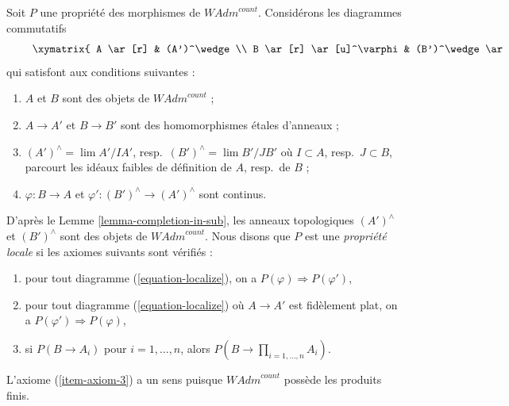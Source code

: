 \begin{situation}
\label{situation-local-property}
Soit $P$ une propriété des morphismes de $\textit{WAdm}^{count}$.
Considérons les diagrammes commutatifs
\begin{equation}
\label{equation-localize}
\vcenter{
\xymatrix{
A \ar[r] & (A')^\wedge \\
B \ar[r] \ar[u]^\varphi & (B')^\wedge \ar[u]_{\varphi'}
}
}
\end{equation}
qui satisfont aux conditions suivantes :
\begin{enumerate}
\item $A$ et $B$ sont des objets de $\textit{WAdm}^{count}$ ;
\item $A \to A'$ et $B \to B'$ sont des homomorphismes étales d'anneaux ;
\item $(A')^\wedge = \lim A'/IA'$, resp.\  $(B')^\wedge = \lim B'/JB'$
où $I \subset A$, resp.\ $J \subset B$,
parcourt les idéaux faibles de définition de $A$, resp.\ de $B$ ;
\item $\varphi : B \to A$ et $\varphi' : (B')^\wedge \to (A')^\wedge$
sont continus.
\end{enumerate}
D'après le Lemme \ref{lemma-completion-in-sub}, les anneaux topologiques
$(A')^\wedge$ et $(B')^\wedge$ sont des objets de $\textit{WAdm}^{count}$.
Nous disons que $P$ est une {\it propriété locale} si les axiomes suivants sont vérifiés :
\begin{enumerate}
\item
\label{item-axiom-1}
pour tout diagramme (\ref{equation-localize}), on a
$P(\varphi) \Rightarrow P(\varphi')$,
\item
\label{item-axiom-2}
pour tout diagramme (\ref{equation-localize}) où $A \to A'$
est fidèlement plat, on a
$P(\varphi') \Rightarrow P(\varphi)$,
\item
\label{item-axiom-3}
si $P(B \to A_i)$ pour $i = 1, \ldots, n$, alors
$P(B \to \prod_{i = 1, \ldots, n} A_i)$.
\end{enumerate}
L'axiome (\ref{item-axiom-3})
a un sens puisque $\textit{WAdm}^{count}$ possède les produits finis.
\end{situation}

